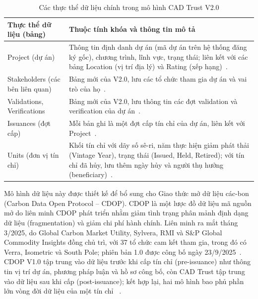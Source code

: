 \begin{table}[htbp]
    \centering
    \caption{Các thực thể dữ liệu chính trong mô hình CAD Trust V2.0}
    \label{tab:cadtrust}
    \small
    \renewcommand{\arraystretch}{1.25}
    \begin{tabularx}{\textwidth}{|p{3.2cm}|X|}
        \hline
        \textbf{Thực thể dữ liệu (bảng)} & \textbf{Thuộc tính khóa và thông tin mô tả} \\
        \hline
        Project (dự án) & Thông tin định danh dự án (mã dự án trên hệ thống đăng ký gốc), chương trình, lĩnh vực, trạng thái; liên kết với các bảng Location (vị trí địa lý)\index{GIS} và Rating (xếp hạng)~\cite{cadtrust2025datamodel}. \\
        \hline
        Stakeholders (các bên liên quan) & Bảng mới của V2.0, lưu các tổ chức tham gia dự án và vai trò của họ~\cite{cadtrust2025datamodel}. \\
        \hline
        Validations, Verifications & Bảng mới của V2.0, lưu thông tin các đợt validation và verification của dự án~\cite{cadtrust2025datamodel}. \\
        \hline
        Issuances (đợt cấp) & Mỗi bản ghi là một đợt cấp tín chỉ của dự án, liên kết với Project~\cite{cadtrust2025datamodel}. \\
        \hline
        Units (đơn vị tín chỉ) & Khối tín chỉ với dãy số sê-ri, năm thực hiện giảm phát thải (Vintage Year)\index{Vintage Year}, trạng thái (Issued, Held, Retired); với tín chỉ đã hủy, lưu thêm ngày hủy và người thụ hưởng (beneficiary)~\cite{cadtrust2025datamodel}. \\
        \hline
    \end{tabularx}
\end{table}

Mô hình dữ liệu này được thiết kế để bổ sung cho Giao thức mở dữ liệu các-bon (Carbon Data Open Protocol -- CDOP). CDOP là một lược đồ dữ liệu mã nguồn mở do liên minh CDOP phát triển nhằm giảm tình trạng phân mảnh định dạng dữ liệu (fragmentation) và giảm chi phí hành chính. Liên minh ra mắt tháng 3/2025, do Global Carbon Market Utility, Sylvera, RMI và S\&P Global Commodity Insights đồng chủ trì, với 37 tổ chức cam kết tham gia, trong đó có Verra, Isometric và South Pole; phiên bản 1.0 được công bố ngày 23/9/2025~\cite{cdop2025press}. CDOP V1.0 tập trung vào dữ liệu trước khi cấp tín chỉ (pre-issuance) như thông tin vị trí dự án, phương pháp luận và hồ sơ công bố, còn CAD Trust tập trung vào dữ liệu sau khi cấp (post-issuance); kết hợp lại, hai mô hình bao phủ phần lớn vòng đời dữ liệu của một tín chỉ~\cite{cadtrust2025datamodel} \cite{cdop2025press}.

